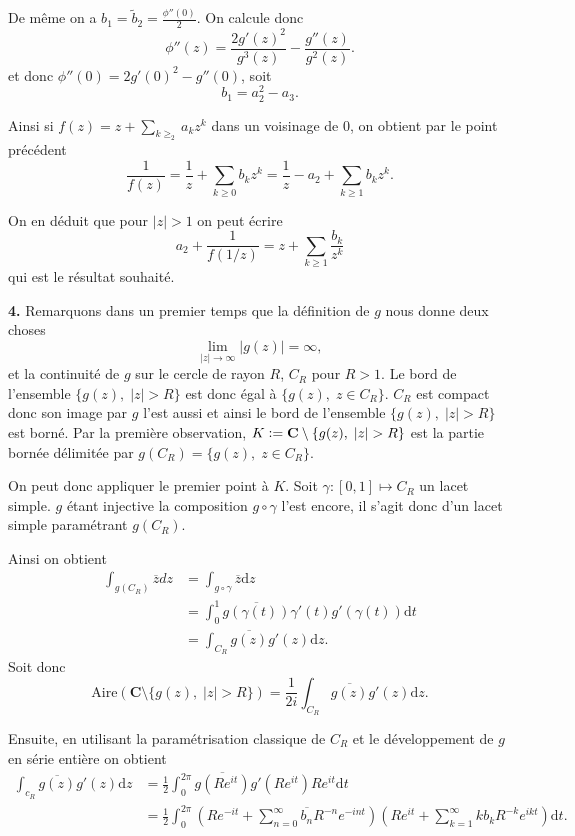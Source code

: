 \documentclass[12pt]{article}
\newcommand{\defeq}{\vcentcolon=}
\newcommand{\C}{\mathbf{C}}
\newcommand{\de}{\mathrm{d}}
\begin{document}
De même on a  $b_1 = \tilde{b}_2 = \frac{\phi''(0)}{2}$. On calcule donc \[
        \phi''(z) = \frac{2g'(z)^{2}}{g^3(z)} - \frac{g''(z)}{g^{2}(z)}
.\] et donc $\phi''(0) = 2g'(0)^{2} - g''(0)$, soit \[
b_1 = a_{2}^{2} - a_{3}
.\] 

Ainsi si $f(z) = z + \sum_{k\ge_2}a_{k}z^{k}$ dans un voisinage de $0$, on obtient par le point précédent \[
\frac{1}{f(z)} = \frac{1}{z} + \sum_{k\ge 0}b_{k}z^{k} = \frac{1}{z} - a_{2} + \sum_{k\ge 1} b_{k}z^{k}
.\]  

On en déduit que pour $|z| > 1$ on peut écrire \[
        a_2 + \frac{1}{f(1/z)} = z + \sum_{k\ge 1} \frac{b_{k}}{z^{k}}
\] qui est le résultat souhaité. 

\bigskip

\textbf{4.} Remarquons dans un premier temps que la définition de $g$ nous donne deux choses \[
\lim_{|z| \to \infty}|g(z)| = \infty,
\] et la continuité de $g$ sur le cercle de rayon $R$, $C_{R}$ pour $R > 1$. Le bord de l'ensemble $\{g(z), \; |z| > R\}$ est donc égal à $\{g(z), \; z \in C_{R}\}$. $C_{R}$ est compact donc son image par $g$ l'est aussi et ainsi le bord de l'ensemble $\{g(z), \; |z| > R\}$ est borné. Par la première observation, $K \defeq \C\setminus \{g(z), \; |z| > R\}$ est la partie bornée délimitée par $g(C_{R}) = \{g(z), \; z \in C_{R}\}$.

On peut donc appliquer le premier point à $K$. 
Soit $\gamma : [0, 1] \longmapsto C_{R}$ un lacet simple. $g$ étant injective la composition $g \circ \gamma$ l'est encore, il s'agit donc d'un lacet simple paramétrant $g(C_{R})$. 

Ainsi on obtient 
\begin{align*}
        \int_{g(C_{R})} \overline{z}dz &= \int_{g\circ \gamma} \overline{z}\de z \\
                                       &= \int_{0}^{1} \overline{g(\gamma(t))}\gamma'(t)g'(\gamma(t)) \de t \\
                                       &= \int_{C_{R}} \overline{g(z)}g'(z)\de z
.\end{align*}
 Soit donc \[
         \mathrm{Aire}(\C \setminus \{g(z), \; |z| > R\}) = \frac{1}{2i}\int_{C_{R}} \overline{g(z)}g'(z) \de z
 .\] 

Ensuite, en utilisant la paramétrisation classique de $C_{R}$ et le développement de $g$ en série entière on obtient 
\begin{align*}
        \int_{c_{R}} \overline{g(z)}g'(z) \de z &= \frac{1}{2}\int_{0}^{2\pi}\overline{g(Re^{it})}g'(Re^{it})Re^{it}\de t \\
                                                &= \frac{1}{2}\int_{0}^{2\pi}(Re^{-it} + \sum_{n=0}^{\infty} \overline{b_{n}}R^{-n}e^{-int})(Re^{it} + \sum_{k = 1}^{\infty} kb_{k}R^{-k}e^{ikt}) \de t
.\end{align*}
\end{document}
